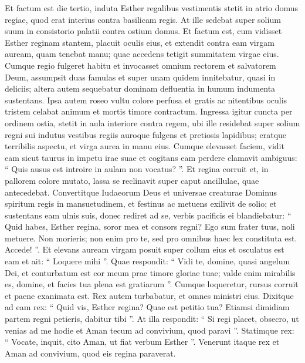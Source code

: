 \begin{biblechapter}
\begin{biblechapter}
\begin{biblechapter}
\begin{biblechapter}
\begin{biblechapter}
\verse Et factum est die tertio, induta Esther regalibus vestimentis stetit in atrio domus regiae, quod erat interius contra basilicam regis. At ille sedebat super solium suum in consistorio palatii contra ostium domus. 
\verse Et factum est, cum vidisset Esther reginam stantem, placuit oculis eius, et extendit contra eam virgam auream, quam tenebat manu; quae accedens tetigit summitatem virgae eius.
 \versea Cumque regio fulgeret habitu et invocasset omnium rectorem et salvatorem Deum, assumpsit duas famulas 
\verseb et super unam quidem innitebatur, quasi in deliciis; 
\versec altera autem sequebatur dominam defluentia in humum indumenta sustentans. 
\versed Ipsa autem roseo vultu colore perfusa et gratis ac nitentibus oculis tristem celabat animum et mortis timore contractum. 
\versee Ingressa igitur cuncta per ordinem ostia, stetit in aula interiore contra regem, ubi ille residebat super solium regni sui indutus vestibus regiis auroque fulgens et pretiosis lapidibus; eratque terribilis aspectu, et virga aurea in manu eius.
 \versef Cumque elevasset faciem, vidit eam sicut taurus in impetu irae suae et cogitans eam perdere clamavit ambiguus: “ Quis ausus est introire in aulam non vocatus? ”. Et regina corruit et, in pallorem colore mutato, lassa se reclinavit super caput ancillulae, quae antecedebat. 
\verseg Convertitque Iudaeorum Deus et universae creaturae Dominus spiritum regis in mansuetudinem, et festinus ac metuens exilivit de solio; et sustentans eam ulnis suis, donec rediret ad se, verbis pacificis ei blandiebatur: 
\verseh “ Quid habes, Esther regina, soror mea et consors regni? Ego sum frater tuus, noli metuere. 
\versei Non morieris; non enim pro te, sed pro omnibus haec lex constituta est. 
\versek Accede! ”.
 \versel Et elevans auream virgam posuit super collum eius et osculatus est eam et ait: “ Loquere mihi ”. 
\versem Quae respondit: “ Vidi te, domine, quasi angelum Dei, et conturbatum est cor meum prae timore gloriae tuae; 
\versen valde enim mirabilis es, domine, et facies tua plena est gratiarum ”. 
\verseo Cumque loqueretur, rursus corruit et paene exanimata est. 
\versep Rex autem turbabatur, et omnes ministri eius.
 \verse Dixitque ad eam rex: “ Quid vis, Esther regina? Quae est petitio tua? Etiamsi dimidiam partem regni petieris, dabitur tibi ”. 
\verse At illa respondit: “ Si regi placet, obsecro, ut venias ad me hodie et Aman tecum ad convivium, quod paravi ”. 
\verse Statimque rex: “ Vocate, inquit, cito Aman, ut fiat verbum Esther ”.
 Venerunt itaque rex et Aman ad convivium, quod eis regina paraverat. 

\end{biblechapter}
\end{biblechapter}
\end{biblechapter}
\end{biblechapter}
\end{biblechapter}
